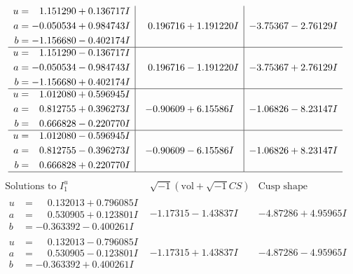 \documentclass[1p]{elsarticle_modified}
\theoremstyle{definition}
\newcommand{\I}{\sqrt{-1}}
\begin{document}
$$\begin{array}{c|c|c}
\begin{aligned}
u &= \phantom{-}1.151290 + 0.136717 I \\
a &= -0.050534 + 0.984743 I \\
b &= -1.156680 - 0.402174 I\end{aligned}
 & \phantom{-}0.196716 + 1.191220 I & -3.75367 - 2.76129 I \\ \hline\begin{aligned}
u &= \phantom{-}1.151290 - 0.136717 I \\
a &= -0.050534 - 0.984743 I \\
b &= -1.156680 + 0.402174 I\end{aligned}
 & \phantom{-}0.196716 - 1.191220 I & -3.75367 + 2.76129 I \\ \hline\begin{aligned}
u &= \phantom{-}1.012080 + 0.596945 I \\
a &= \phantom{-}0.812755 + 0.396273 I \\
b &= \phantom{-}0.666828 - 0.220770 I\end{aligned}
 & -0.90609 + 6.15586 I & -1.06826 - 8.23147 I \\ \hline\begin{aligned}
u &= \phantom{-}1.012080 - 0.596945 I \\
a &= \phantom{-}0.812755 - 0.396273 I \\
b &= \phantom{-}0.666828 + 0.220770 I\end{aligned}
 & -0.90609 - 6.15586 I & -1.06826 + 8.23147 I\\
 \hline 
 \end{array}$$\newpage$$\begin{array}{c|c|c}  
\text{Solutions to }I^u_{1}& \I (\text{vol} + \sqrt{-1}CS) & \text{Cusp shape}\\
 \hline 
\begin{aligned}
u &= \phantom{-}0.132013 + 0.796085 I \\
a &= \phantom{-}0.530905 + 0.123801 I \\
b &= -0.363392 - 0.400261 I\end{aligned}
 & -1.17315 - 1.43837 I & -4.87286 + 4.95965 I \\ \hline\begin{aligned}
u &= \phantom{-}0.132013 - 0.796085 I \\
a &= \phantom{-}0.530905 - 0.123801 I \\
b &= -0.363392 + 0.400261 I\end{aligned}
 & -1.17315 + 1.43837 I & -4.87286 - 4.95965 I \\ \hline\begin{aligned}

\end{aligned}
\end{array}$$
\end{document}
